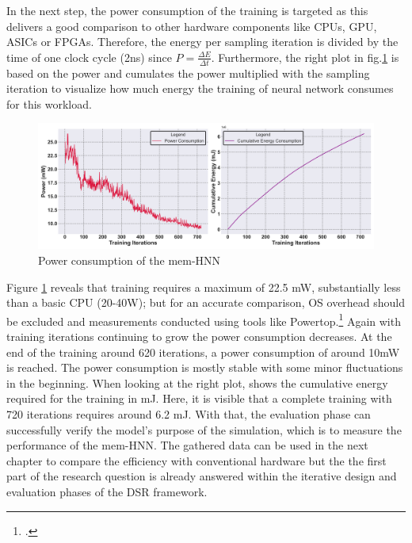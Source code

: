 In the next step, the power consumption of the training is targeted as this delivers a good comparison to other
hardware components like \ac{CPU}s, \ac{GPU}, \ac{ASIC}s or \ac{FPGA}s.
Therefore, the energy per sampling iteration is divided by the time of one clock cycle (2ns) since \(P = \frac{\Delta E}{\Delta t}\).
Furthermore, the right plot in fig.\ref{Power consumption} is based on the power and cumulates the power multiplied with the sampling iteration to visualize how much energy the training of neural network consumes for this workload.
\begin{figure}[H]
    \centering
    \includegraphics[width=0.9\linewidth]{graphics/energy_consumption_cumulative_plot.png}
    \caption{Power consumption of the \ac{mem-HNN}}
    \label{Power consumption}
\end{figure}
Figure \ref{Power consumption} reveals that training requires a maximum of 22.5 mW, substantially less than a basic CPU (20-40W); but for an accurate comparison, OS overhead should be excluded and measurements conducted using tools like Powertop.\footcite[cf.][1]{PowertopArchWiki} 
Again with training iterations continuing to grow the power consumption decreases. 
At the end of the training around 620 iterations, a power consumption of around 10mW is reached. 
The power consumption is mostly stable with some minor fluctuations in the beginning.
When looking at the right plot, shows the cumulative energy required for the training in mJ.
Here, it is visible that a complete training with 720 iterations requires around 6.2 mJ. 
With that, the evaluation phase can successfully verify the model's purpose of the simulation, which is to measure the performance of the \ac{mem-HNN}.
The gathered data can be used in the next chapter to compare the efficiency with conventional hardware but the
the first part of the research question is already answered within the iterative design and evaluation phases of the \ac{DSR} framework.
